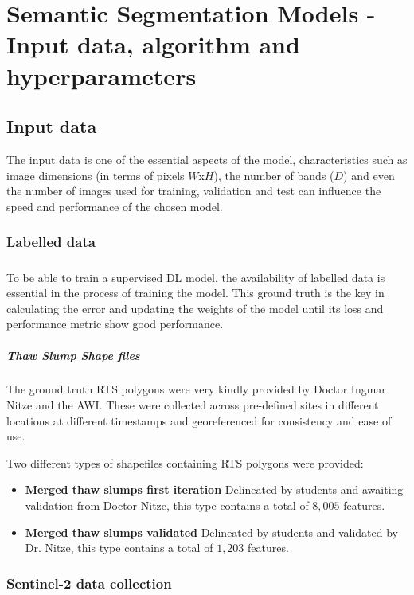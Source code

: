\chapter{Semantic Segmentation Models - Input data, algorithm and hyperparameters} \label{input_data_section}
\section{Input data} \label{input_data_sec}
The input data is one of the essential aspects of the model, characteristics such as image dimensions (in terms of pixels $W$x$H$), the number of bands ($D$) and even the number of images used for training, validation and test can influence the speed and performance of the chosen model.
\subsection{Labelled data} \label{labeled_data}
\paragraph{}
To be able to train a supervised \gls{DL} model, the availability of labelled data is essential in the process of training the model. This ground truth is the key in calculating the error and updating the weights of the model until its loss and performance metric show good performance.
\paragraph{Thaw Slump Shape files}
The ground truth \gls{RTS} polygons were very kindly provided by Doctor Ingmar Nitze and the \gls{AWI}. These were collected across pre-defined sites in different locations at different timestamps and georeferenced for consistency and ease of use.

Two different types of shapefiles containing \gls{RTS} polygons were provided:
\begin{itemize}
    \item \textbf{Merged thaw slumps first iteration} Delineated by students and awaiting validation from Doctor Nitze, this type contains a total of $8,005$ features.
    \item \textbf{Merged thaw slumps validated} Delineated by students and validated by Dr. Nitze, this type contains a total of $1,203$ features.
\end{itemize}
\subsection{Sentinel-2 data collection} \label{rs_data_collection}
